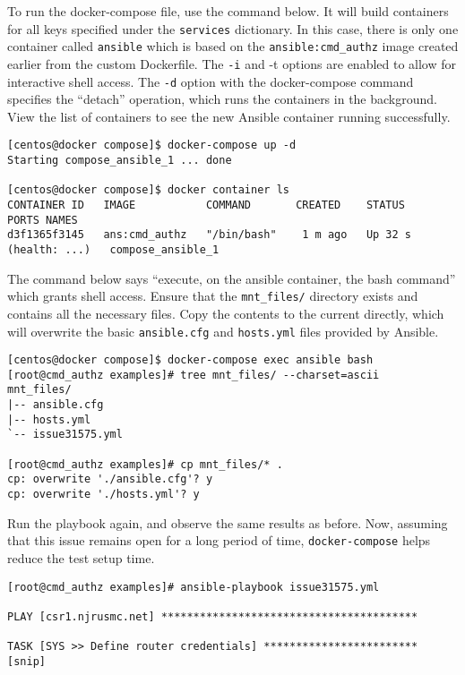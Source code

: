 To run the docker-compose file, use the command below. It will build
containers for all keys specified under the \verb|services| dictionary. In this
case, there is only one container called \verb|ansible| which is based on the
\verb|ansible:cmd_authz| image created earlier from the custom Dockerfile. The
\verb|-i| and -t options are enabled to allow for interactive shell access.
The \verb|-d| option with the docker-compose command specifies the
``detach'' operation, which runs the containers in the background. View the
list of containers to see the new Ansible container running successfully.

\begin{verbatim}
[centos@docker compose]$ docker-compose up -d
Starting compose_ansible_1 ... done

[centos@docker compose]$ docker container ls
CONTAINER ID   IMAGE           COMMAND       CREATED    STATUS            PORTS NAMES
d3f1365f3145   ans:cmd_authz   "/bin/bash"    1 m ago   Up 32 s (health: ...)   compose_ansible_1
\end{verbatim}

The command below says ``execute, on the ansible container, the bash command''
which grants shell access. Ensure that the \verb|mnt_files/| directory exists and
contains all the necessary files. Copy the contents to the current directly,
which will overwrite the basic \verb|ansible.cfg| and \verb|hosts.yml| files
provided by
Ansible.

\begin{verbatim}
[centos@docker compose]$ docker-compose exec ansible bash
[root@cmd_authz examples]# tree mnt_files/ --charset=ascii
mnt_files/
|-- ansible.cfg
|-- hosts.yml
`-- issue31575.yml

[root@cmd_authz examples]# cp mnt_files/* .
cp: overwrite './ansible.cfg'? y
cp: overwrite './hosts.yml'? y
\end{verbatim}

Run the playbook again, and observe the same results as before. Now, assuming
that this issue remains open for a long period of time, \verb|docker-compose|
helps reduce the test setup time.

\begin{verbatim}
[root@cmd_authz examples]# ansible-playbook issue31575.yml 

PLAY [csr1.njrusmc.net] ****************************************

TASK [SYS >> Define router credentials] ************************
[snip]
\end{verbatim}

